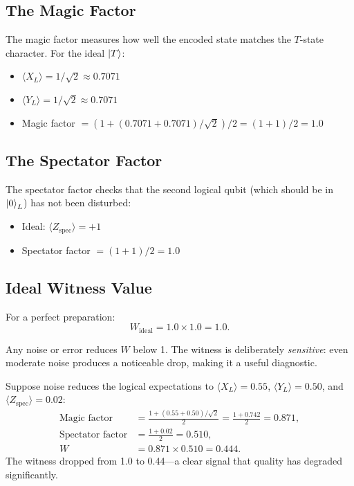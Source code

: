 \documentclass[11pt,a4paper,twoside]{report}
\theoremstyle{definition}
\newcommand{\expect}[1]{\langle #1 \rangle}
\newcommand{\ketT}{\ket{T}}
\begin{document}
\subsection{The Magic Factor}

The magic factor measures how well the encoded state matches the
$T$-state character. For the ideal $\ketT$:
\begin{itemize}
  \item $\expect{X_L} = 1/\sqrt{2} \approx 0.7071$
  \item $\expect{Y_L} = 1/\sqrt{2} \approx 0.7071$
  \item Magic factor $= (1 + (0.7071 + 0.7071)/\sqrt{2})/2 = (1+1)/2 = 1.0$
\end{itemize}

\subsection{The Spectator Factor}

The spectator factor checks that the second logical qubit (which should
be in $\ket{0}_L$) has not been disturbed:
\begin{itemize}
  \item Ideal: $\expect{Z_{\text{spec}}} = +1$
  \item Spectator factor $= (1+1)/2 = 1.0$
\end{itemize}

\subsection{Ideal Witness Value}

For a perfect preparation:
\begin{equation}
  W_{\text{ideal}} = 1.0 \times 1.0 = 1.0.
\end{equation}

Any noise or error reduces $W$ below 1. The witness is deliberately
\emph{sensitive}: even moderate noise produces a noticeable drop, making
it a useful diagnostic.

\begin{example}[title={Witness Under Noise}]
Suppose noise reduces the logical expectations to $\expect{X_L} = 0.55$,
$\expect{Y_L} = 0.50$, and $\expect{Z_{\text{spec}}} = 0.02$:
\begin{align}
  \text{Magic factor} &= \frac{1 + (0.55 + 0.50)/\sqrt{2}}{2}
                       = \frac{1 + 0.742}{2} = 0.871, \\
  \text{Spectator factor} &= \frac{1 + 0.02}{2} = 0.510, \\
  W &= 0.871 \times 0.510 = 0.444.
\end{align}
The witness dropped from 1.0 to 0.44---a clear signal that quality has
degraded significantly.
\end{example}
\end{document}

